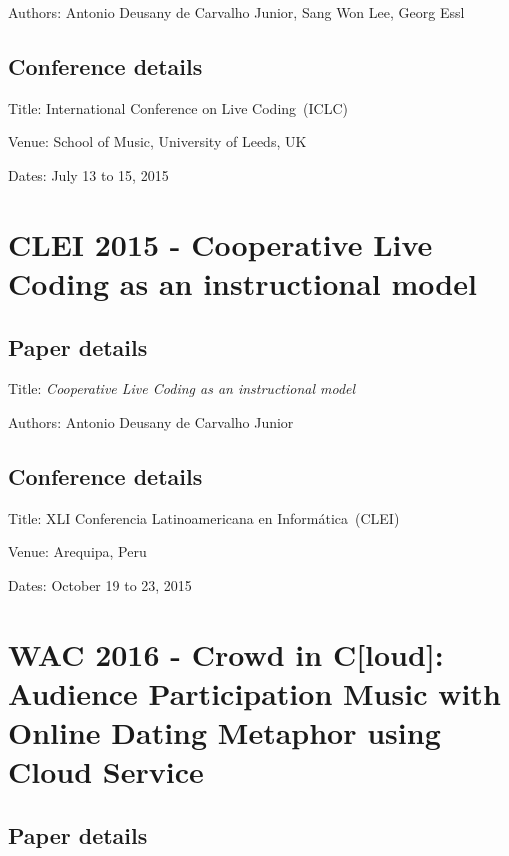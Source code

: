 Authors: Antonio Deusany de Carvalho Junior, Sang Won Lee, Georg Essl

\subsection*{Conference details}

Title: International Conference on Live Coding~(ICLC)

Venue: School of Music, University of Leeds, UK

Dates: July 13 to 15, 2015



\section{CLEI 2015 - Cooperative Live Coding as an instructional model}
\label{ape:paperclei2015}

\subsection*{Paper details}

Title: \textit{Cooperative Live Coding as an instructional model}

Authors: Antonio Deusany de Carvalho Junior

\subsection*{Conference details}

Title: XLI Conferencia Latinoamericana en Informática~(CLEI)

Venue: Arequipa, Peru

Dates: October 19 to 23, 2015




\section{WAC 2016 - Crowd in C[loud]: Audience Participation Music with Online Dating Metaphor using Cloud Service}
\label{ape:paperwac2016}

\subsection*{Paper details}

